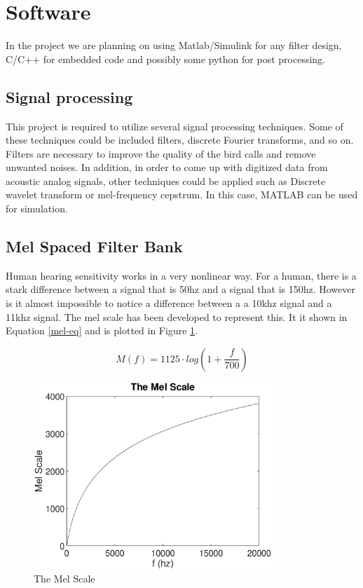 \documentclass[12pt,journal,compsoc]{IEEEtran}
\begin{document}
\section{Software}
In the project we are planning on using Matlab/Simulink for any filter design, C/C++ for embedded code and possibly some python for post processing.

\subsection{Signal processing}
This project is required to utilize several signal processing techniques. Some of these techniques could be included filters, discrete Fourier transforms, and so on. Filters are necessary to improve the quality of the bird calls and remove unwanted noises. In addition, in order to come up with digitized data from acoustic analog signals, other techniques could be applied such as Discrete wavelet transform or mel-frequency cepstrum. In this case, MATLAB can be used for simulation.

\subsection{Mel Spaced Filter Bank}
Human hearing sensitivity works in a very nonlinear way. For a human, there is a stark difference between a signal that is 50hz and a signal that is 150hz. However is it almost impossible to notice a difference between a a 10khz signal and a 11khz signal. The mel scale has been developed to represent this. It it shown in Equation \ref{mel-eq} and is plotted in Figure \ref{mel}. 

\begin{equation}
M(f) = 1125 \cdot log(1+\frac{f}{700})
\label{mel-eq}
\end{equation}

\begin{figure}[h]
\includegraphics[width=9cm]{mel.eps}
\caption{The Mel Scale}
\label{mel}
\end{figure}
\end{document}
